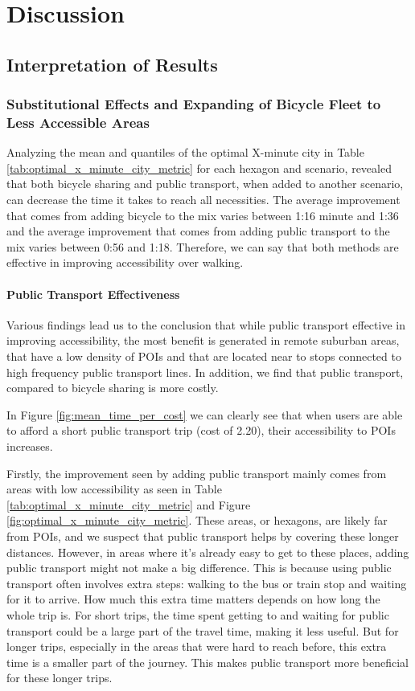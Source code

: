 \clearpage
\section{Discussion}
\label{sec:discussion}

\subsection{Interpretation of Results}
\subsubsection{Substitutional Effects and Expanding of Bicycle Fleet to Less Accessible Areas}

Analyzing the mean and quantiles of the optimal X-minute city in Table \ref{tab:optimal_x_minute_city_metric} for each hexagon and scenario, revealed that both bicycle sharing and public transport, when added to another scenario, can decrease the time it takes to reach all necessities.
The average improvement that comes from adding bicycle to the mix varies between 1:16 minute and 1:36 and the average improvement that comes from adding public transport to the mix varies between 0:56 and 1:18.
Therefore, we can say that both methods are effective in improving accessibility over walking.


\paragraph{Public Transport Effectiveness}
Various findings lead us to the conclusion that while public transport effective in improving accessibility, the most benefit is generated in remote suburban areas, that have a low density of POIs and that are located near to stops connected to high frequency public transport lines.
In addition, we find that public transport, compared to bicycle sharing is more costly.

In Figure \ref{fig:mean_time_per_cost} we can clearly see that when users are able to afford a short public transport trip (cost of 2.20), their accessibility to POIs increases.

Firstly, the improvement seen by adding public transport mainly comes from areas with low accessibility as seen in Table \ref{tab:optimal_x_minute_city_metric} and Figure \ref{fig:optimal_x_minute_city_metric}.
These areas, or hexagons, are likely far from POIs, and we suspect that  public transport helps by covering these longer distances. 
However, in areas where it's already easy to get to these places, adding public transport might not make a big difference. 
This is because using public transport often involves extra steps: walking to the bus or train stop and waiting for it to arrive. 
How much this extra time matters depends on how long the whole trip is.
For short trips, the time spent getting to and waiting for public transport could be a large part of the travel time, making it less useful. 
But for longer trips, especially in the areas that were hard to reach before, this extra time is a smaller part of the journey. 
This makes public transport more beneficial for these longer trips. 

